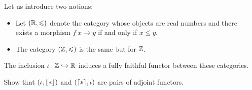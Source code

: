 \documentclass[12pt]{memoir}
\begin{document}

\begin{Ej}
    Let us introduce two notions:
    \begin{itemize}
        \itemsep=-0.4em
        \item  Let $(\mathbb{R},\leqslant)$ denote the category whose objects are real numbers and there exists a
        morphism $f\: x\to y$ if and only if $x\leq y$.
        \item The category $(\mathbb{Z},\leqslant)$ is the same but for $\mathbb{Z}$.
    \end{itemize}
    The inclusion $\iota\mathbin{:}\mathbb{Z}\hookrightarrow\mathbb{R}$ induces a fully faithful functor between these categories.\par 
    Show that $(\iota,\lfloor\ast\rfloor)$ and $(\lceil\ast\rceil,\iota)$ are pairs of adjoint functors.
\end{Ej}
\end{document}
